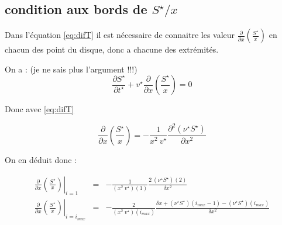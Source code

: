 \subsection{condition aux bords de $S^{\star}/x$}

Dans l'équation \eqref{eq:difT} il est nécessaire de connaitre les valeur $\frac{\partial}{\partial x}\left(\frac{S^{\star}}{x}\right)$ en chacun des point du disque, donc a chacune des extrémités. 

On a : (je ne sais plus l'argument !!!)
\begin{equation}
\frac{\partial S^{\star}}{\partial t^{\star}} + v^{\star} \frac{\partial}{\partial x} \left(\frac{S^{\star}}{x}\right)=0
\end{equation}

Donc avec \eqref{eq:difT}

\begin{equation}
\frac{\partial}{\partial x} \left(\frac{S^{\star}}{x}\right) = -\frac{1}{x^2\ v^{\star}} \frac{\partial^2 (\nu^{\star} S^{\star})}{\partial x^2}
\end{equation}

On en déduit donc :

\begin{eqnarray}
\left. \frac{\partial}{\partial x} \left(\frac{S^{\star}}{x}\right) \right|_{i=1 }&=& - \frac{1}{(x^2\ v^{\star})(1)} \frac{2\ (\nu^{\star} S^{\star})(2)}{\delta x ^2} \\
\left. \frac{\partial}{\partial x} \left(\frac{S^{\star}}{x}\right) \right|_{i=i_{max}} &=& - \frac{2}{(x^2\ v^{\star})(i_{max})} \frac{\delta x + (\nu^{\star} S^{\star})(i_{max}-1)- (\nu^{\star} S^{\star})(i_{max})}{\delta x^2}
\end{eqnarray}